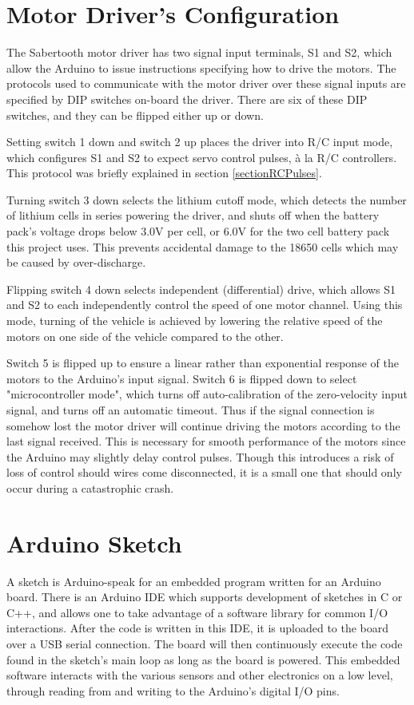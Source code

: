\section{Motor Driver's Configuration}
The Sabertooth motor driver has two signal input terminals, S1 and S2, which allow the Arduino to issue instructions specifying how to drive the motors. The protocols used to communicate with the motor driver over these signal inputs are specified by DIP switches on-board the driver. There are six of these DIP switches, and they can be flipped either up or down.

Setting switch 1 down and switch 2 up places the driver into R/C input mode, which configures S1 and S2 to expect servo control pulses, à la R/C controllers. This protocol was briefly explained in section \ref{sectionRCPulses}. \cite{sabertoothUserGuide}

Turning switch 3 down selects the lithium cutoff mode, which detects the number of lithium cells in series powering the driver, and shuts off when the battery pack's voltage drops below 3.0V per cell, or 6.0V for the two cell battery pack this project uses. This prevents accidental damage to the 18650 cells which may be caused by over-discharge.

Flipping switch 4 down selects independent (differential) drive, which allows S1 and S2 to each independently control the speed of one motor channel. Using this mode, turning of the vehicle is achieved by lowering the relative speed of the motors on one side of the vehicle compared to the other.

Switch 5 is flipped up to ensure a linear rather than exponential response of the motors to the Arduino's input signal. Switch 6 is flipped down to select "microcontroller mode", which turns off auto-calibration of the zero-velocity input signal, and turns off an automatic timeout. Thus if the signal connection is somehow lost the motor driver will continue driving the motors according to the last signal received. This is necessary for smooth performance of the motors since the Arduino may slightly delay control pulses. Though this introduces a risk of loss of control should wires come disconnected, it is a small one that should only occur during a catastrophic crash.

\section{Arduino Sketch}
A sketch is Arduino-speak for an embedded program written for an Arduino board. There is an Arduino IDE which supports development of sketches in C or C++, and allows one to take advantage of a software library for common I/O interactions. After the code is written in this IDE, it is uploaded to the board over a USB serial connection. The board will then continuously execute the code found in the sketch's main loop as long as the board is powered. This embedded software interacts with the various sensors and other electronics on a low level, through reading from and writing to the Arduino's digital I/O pins.

